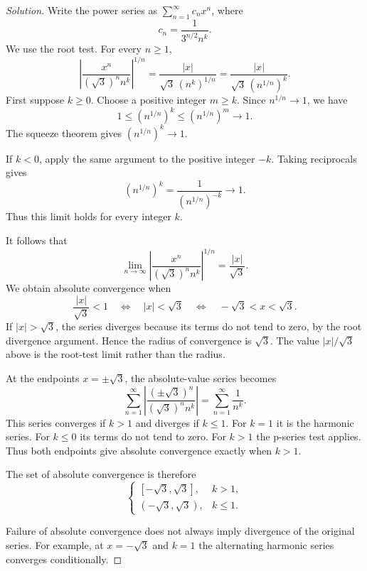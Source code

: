 \begin{proof}[Solution]
  Write the power series as $\sum_{n=1}^{\infty}c_nx^n$, where
  \[
    c_n=\frac{1}{3^{n/2}n^k}.
  \]
  We use the root test. For every $n\ge1$,
  \[
    \left|\frac{x^n}{(\sqrt3)^n n^k}\right|^{1/n}
    =\frac{|x|}{\sqrt3\,(n^k)^{1/n}}
    =\frac{|x|}{\sqrt3\,(n^{1/n})^k}.
  \]
  First suppose $k\ge0$.
  Choose a positive integer $m\ge k$. Since
  $n^{1/n}\to1$, we have
  \[
    1\le(n^{1/n})^k\le(n^{1/n})^m\longrightarrow1.
  \]
  The squeeze theorem gives $(n^{1/n})^k\to1$.

  If $k<0$, apply the same argument to the positive integer $-k$.
  Taking reciprocals gives
  \[
    (n^{1/n})^k=\frac{1}{(n^{1/n})^{-k}}\longrightarrow1.
  \]
  Thus this limit holds for every integer $k$.

  It follows that
  \[
    \lim_{n\to\infty}
      \left|\frac{x^n}{(\sqrt3)^n n^k}\right|^{1/n}
    =\frac{|x|}{\sqrt3}.
  \]
  We obtain absolute convergence when
  \[
    \frac{|x|}{\sqrt3}<1
    \quad\Longleftrightarrow\quad
    |x|<\sqrt3
    \quad\Longleftrightarrow\quad
    -\sqrt3<x<\sqrt3.
  \]
  If $|x|>\sqrt3$, the series diverges
  because its terms do not tend to zero, by the root
  divergence argument.
  Hence the radius of convergence is $\sqrt3$.
  The value $|x|/\sqrt3$ above is the root-test limit rather than the radius.

  At the endpoints $x=\pm\sqrt3$, the absolute-value series becomes
  \[
    \sum_{n=1}^{\infty}
      \left|\frac{(\pm\sqrt3)^n}{(\sqrt3)^n n^k}\right|
    =\sum_{n=1}^{\infty}\frac{1}{n^k}.
  \]
  This series converges if $k>1$ and diverges if
  $k\le1$.
  For $k=1$ it is the harmonic series. For $k\le0$
  its terms do not tend to zero. For $k>1$ the p-series test applies.
  Thus both endpoints give absolute convergence exactly when $k>1$.

  The set of absolute convergence is therefore
  \[
    \begin{cases}
      [-\sqrt3,\sqrt3],&k>1,\\
      (-\sqrt3,\sqrt3),&k\le1.
    \end{cases}
  \]

  Failure of absolute convergence does not always imply divergence
  of the original series.
  For example, at $x=-\sqrt3$ and $k=1$ the
  alternating harmonic series converges conditionally.
\end{proof}
